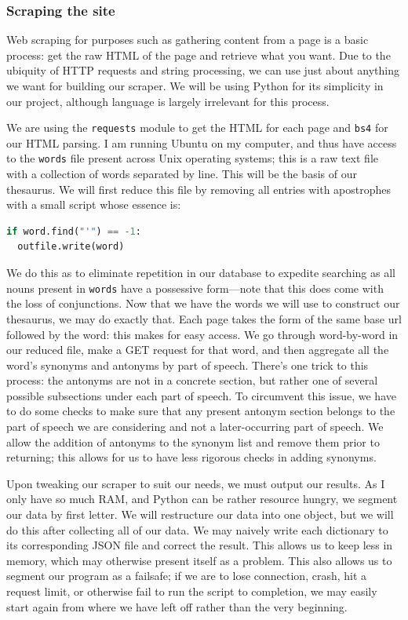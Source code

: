 \documentclass[11pt, twoside, reqno]{book}
\begin{document}
\subsubsection{Scraping the site}

Web scraping for purposes such as gathering content from a page is a basic process: get the raw HTML of the page and retrieve what you want. Due to the ubiquity of HTTP requests and string processing, we can use just about anything we want for building our scraper. We will be using Python for its simplicity in our project, although language is largely irrelevant for this process.


We are using the \texttt{requests} module to get the HTML for each page and \texttt{bs4} for our HTML parsing. I am running Ubuntu on my computer, and thus have access to the \texttt{words} file present across Unix operating systems; this is a raw text file with a collection of words separated by line. This will be the basis of our thesaurus. We will first reduce this file by removing all entries with apostrophes with a small script whose essence is:

\begin{lstlisting}[language=Python]
if word.find("'") == -1:
  outfile.write(word)
\end{lstlisting}

We do this as to eliminate repetition in our database to expedite searching as all nouns present in \texttt{words} have a possessive form—note that this does come with the loss of conjunctions. Now that we have the words we will use to construct our thesaurus, we may do exactly that. Each page takes the form of the same base url followed by the word: this makes for easy access. We go through word-by-word in our reduced file, make a GET request for that word, and then aggregate all the word's synonyms and antonyms by part of speech. There's one trick to this process: the antonyms are not in a concrete section, but rather one of several possible subsections under each part of speech. To circumvent this issue, we have to do some checks to make sure that any present antonym section belongs to the part of speech we are considering and not a later-occurring part of speech. We allow the addition of antonyms to the synonym list and remove them prior to returning; this allows for us to have less rigorous checks in adding synonyms.

Upon tweaking our scraper to suit our needs, we must output our results. As I only have so much RAM, and Python can be rather resource hungry, we segment our data by first letter. We will restructure our data into one object, but we will do this after collecting all of our data. We may naively write each dictionary to its corresponding JSON file and correct the result. This allows us to keep less in memory, which may otherwise present itself as a problem. This also allows us to segment our program as a failsafe; if we are to lose connection, crash, hit a request limit, or otherwise fail to run the script to completion, we may easily start again from where we have left off rather than the very beginning.
\end{document}
